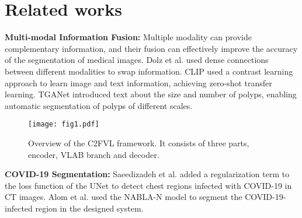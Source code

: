 \documentclass{article}
\begin{document}
\section{Related works}
\vspace{-2mm}
\label{sec:relatedworks}
\textbf{Multi-modal Information Fusion:} 
Multiple modality can provide complementary information, and their fusion can effectively improve the accuracy of the segmentation of medical images. Dolz et al. \cite{dolz2018hyperdense} used dense connections between different modalities to swap information.
CLIP \cite{radford2021learning} used a contrast learning approach to learn image and text information, achieving zero-shot transfer learning.  %
TGANet \cite{tomar2022tganet} introduced text about the size and number of polyps, enabling automatic segmentation of polyps of different scales.
\setlength{\belowcaptionskip}{0pt}
\setlength{\abovecaptionskip}{0pt}
\begin{figure*}[!ht]
    \centering
	\centerline{\texttt{[image: fig1.pdf]}}
	\caption{Overview of the C2FVL framework. It consists of three parts, encoder, VLAB branch and decoder.}
	\label{fig1}
	\vspace{-2mm}
\end{figure*}

\noindent\textbf{COVID-19 Segmentation:} 
Saeedizadeh et al. \cite{saeedizadeh2021covid} added a regularization term to the loss function of the UNet to detect chest regions infected with COVID-19 in CT images. 
Alom et al. \cite{alom2020covid_mtnet} used the NABLA-N model to segment the COVID-19-infected region in the designed system. %
\end{document}

